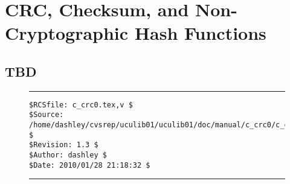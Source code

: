 
\chapter[CRC, Checksum, and Non-Cryptographic Hash Functions]
        {CRC, Checksum, and Non-Cryptographic Hash Functions}
\label{ccrc0}


\section{TBD}
\label{ccrc0:stbd0}



\noindent\begin{figure}[!b]
\noindent\rule[-0.25in]{\textwidth}{1pt}
\begin{tiny}
\begin{verbatim}
$RCSfile: c_crc0.tex,v $
$Source: /home/dashley/cvsrep/uculib01/uculib01/doc/manual/c_crc0/c_crc0.tex,v $
$Revision: 1.3 $
$Author: dashley $
$Date: 2010/01/28 21:18:32 $
\end{verbatim}
\end{tiny}
\noindent\rule[0.25in]{\textwidth}{1pt}
\end{figure}

%
%
%

